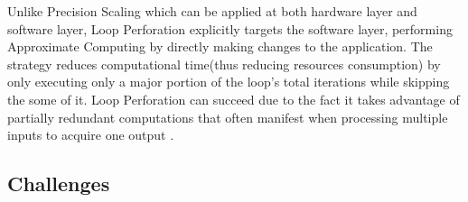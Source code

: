 Unlike Precision Scaling which can be applied at both hardware layer and software layer, Loop Perforation explicitly targets the software layer, performing Approximate Computing by directly making changes to the application. The strategy reduces computational time(thus reducing resources consumption) by only executing only a major portion of the loop's total iterations while skipping the some of it. Loop Perforation can succeed due to the fact it takes advantage of partially redundant computations that often manifest when processing multiple inputs to acquire one output \cite{LoopPerforation}. \\

\subsection{Challenges}

